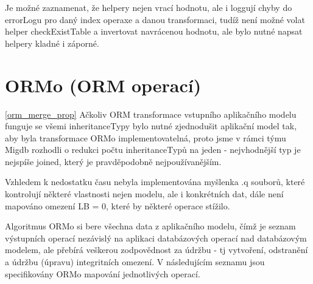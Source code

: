 \documentclass[11pt,twoside,a4paper]{book}
\begin{document}
Je možné zaznamenat, že helpery nejen vrací hodnotu, ale i loggují chyby do
errorLogu pro daný index operaxe a danou transformaci, tudíž není možné volat
helper checkExistTable a invertovat navrácenou hodnotu, ale bylo nutné napsat
helpery kladné i záporné.

\section{ORMo (ORM operací)}

\ref{orm_merge_prop}
Ačkoliv ORM transformace vstupního aplikačního modelu funguje se všemi
inheritanceTypy bylo nutné zjednodušit aplikační model tak, aby byla
transformace ORMo implementovatelná, proto jsme v rámci týmu Migdb rozhodli o
redukci počtu inheritanceTypů na jeden - nejvhodnější typ je nejspíše joined,
který je pravděpodobně nejpoužívanějším.

Vzhledem k nedostatku času nebyla implementována myšlenka .q souborů, které
kontrolují některé vlastnosti nejen modelu, ale i konkrétních dat, dále není
mapováno omezení LB = 0, které by některé operace stížilo. 

Algoritmus ORMo si bere všechna data z aplikačního modelu, čímž je seznam
výstupních operací nezávislý na aplikaci databázových operací nad databázovým
modelem, ale přebírá veškerou zodpovědnost za údržbu - tj vytvoření, odstranění
a údržbu (úpravu) integritních omezení.
V následujícím seznamu jsou specifikovány ORMo mapování jednotlivých operací.
\end{document}
